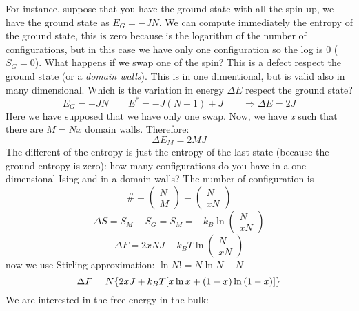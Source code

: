 \documentclass[../main/main.tex]{subfiles}
\begin{document}
For instance, suppose that you have the ground state with all the spin up, we have the ground state as \( E_G = -JN \). We can compute immediately the entropy of the ground state, this is zero because is the logarithm of the number of configurations, but in this case we have only one configuration so the log is 0 (\( S_G = 0 \)).
What happens if we swap one of the spin? This is a defect respect the ground state (or a \emph{domain walls}). This is in one dimentional, but is valid also in many dimensional. Which is the variation in energy \( \Delta E \) respect the ground state?
\begin{equation}
  E_G = -JN \qquad E^* = -J(N-1) +J \qquad \Rightarrow \Delta E = 2J
\end{equation}
Here we have supposed that we have only one swap. Now, we have \emph{x} such that there are
\(   M = Nx \) domain walls.
Therefore:
\begin{equation}
  \Delta E_M = 2MJ
\end{equation}
The different of the entropy is just the entropy of the last state (because the ground entropy is zero): how many configurations do you have in a one dimensional Ising and in a domain walls? The number of configuration is
\begin{equation}
  \# = \begin{pmatrix}
  N \\
  M
  \end{pmatrix} = \begin{pmatrix}
  N \\
  xN
  \end{pmatrix}
\end{equation}
\begin{equation}
  \Delta S = S_M -S_G = S_M = -k_B \ln{\begin{pmatrix}
  N \\
  xN
  \end{pmatrix} }
\end{equation}
\begin{equation}
  \Delta F = 2xNJ - k_B T \ln{\begin{pmatrix}
  N \\
  xN
  \end{pmatrix} }
\end{equation}
now we use Stirling approximation: \( \ln{N!} = N \ln{N} - N   \)
\begin{equation}
  \Delta F = N \qty{ 2xJ +k_B T \qty[x \ln{x} + (1-x)\ln{(1-x)}  ] }
\end{equation}
We are interested in the free energy in the bulk:
\end{document}
